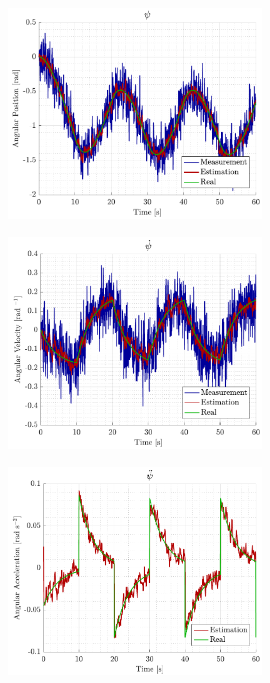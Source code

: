 \section{}
\begin{figure}[H]
    \includegraphics[width=0.6\textwidth]{figures/sim_yaw}
    \caption{}
    \label{fig:sim_yaw}
\end{figure}

\begin{figure}[H]
    \includegraphics[width=0.6\textwidth]{figures/sim_yawdot}
    \caption{}
    \label{fig:sim_yawdot}
\end{figure}

\begin{figure}[H]
    \includegraphics[width=0.6\textwidth]{figures/sim_yawddot}
    \caption{}
    \label{fig:sim_yawddot}
\end{figure}

